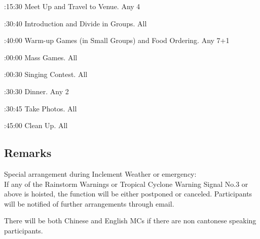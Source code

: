 \bTR{}:15:30
\eTD\bTD Meet Up and Travel to Venue.
\eTD\bTD Any 4
\eTD\eTR

\bTR{}:30:40
\eTD\bTD Introduction and Divide in Groups.
\eTD\bTD All
\eTD\eTR

\bTR{}:40:00
\eTD\bTD Warm-up Games (in Small Groups) and Food Ordering.
\eTD\bTD Any 7+1
\eTD\eTR

\bTR{}:00:00
\eTD\bTD Mass Games.
\eTD\bTD All
\eTD\eTR

\bTR{}:00:30
\eTD\bTD Singing Contest.
\eTD\bTD All
\eTD\eTR

\bTR{}:30:30
\eTD\bTD Dinner.
\eTD\bTD Any 2
\eTD\eTR

\bTR{}:30:45
\eTD\bTD Take Photos.
\eTD\bTD All
\eTD\eTR

\bTR{}:45:00
\eTD\bTD Clean Up.
\eTD\bTD All
\eTD\eTR

\eTABLEbody
\eTABLE

\subsection{Remarks}
\startitemize
\item Special arrangement during Inclement Weather or emergency: \\
If any of the Rainstorm Warnings or Tropical Cyclone Warning Signal No.3 or above is hoisted, the function will be either postponed or canceled. Participants will be notified of further arrangements through email.
\item There will be both Chinese and English MCs if there are non cantonese speaking participants.
\stopitemize

\stopsection
\pagebreak
